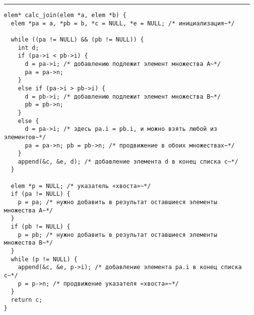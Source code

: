 \documentclass{article}
\begin{document}
\lstset{language = C,
    extendedchars = \true,
    keepspaces = true,
    breaklines=true,
    frame=lines}
\hrule
\begin{lstlisting}[title=\textbf {Алгоритм 1.5} Вычисление объединения слиянием]
elem* calc_join(elem *a, elem *b) {
  elem *pa = a, *pb = b, *c = NULL, *e = NULL; /* инициализация~*/

  while ((pa != NULL) && (pb != NULL)) {
    int d;
    if (pa->i < pb->i) {
      d = pa->i; /* добавлению подлежит элемент множества А~*/
      pa = pa->n;
    }
    else if (pa->i > pb->i) {
      d = pb->i; /* добавлению подлежит элемент множества В~*/
      pb = pb->n;
    }
    else {
      d = pa->i; /* здесь pa.i = pb.i, и можно взять любой из элементов~*/
      pa = pa->n; pb = pb->n; /* продвижение в обоих множествах~*/
    }
    append(&c, &e, d); /* добавление элемента d в конец списка с~*/
  }

  elem *p = NULL; /* указатель «хвоста»~*/
  if (pa != NULL) {
    p = pa; /* нужно добавить в результат оставшиеся элементы множества А~*/
  }
  if (pb != NULL) {
    p = pb; /* нужно добавить в результат оставшиеся элементы множества В~*/
  }
  while (p != NULL) {
    append(&c, &e, p->i); /* добавление элемента pa.i в конец списка с~*/
    p = p->n; /* продвижение указателя «хвоста»~*/
  }
  return c;
}
\end{lstlisting}
\end{document}
